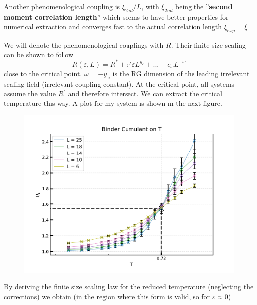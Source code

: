 	Another phenomenological coupling is $\xi_{2nd}/L$, with $\xi_{2nd}$ being the ''\textbf{second moment correlation length}'' which seems to have better properties for numerical extraction and converges fast to the actual correlation length $\xi_{exp} = \xi$
	
	We will denote the phenomenological couplings with $R$. Their finite size scaling can be shown \cite{hasenbusch2008critical} to follow
	\begin{equation}
		R(\varepsilon, L) =	R^* + r' \varepsilon L^{y_\varepsilon} + ... + c_\omega L^{-\omega}
	\end{equation}
	close to the critical point. $\omega =	- y_\omega$ is the RG dimension of the leading irrelevant scaling field (irrelevant coupling constant). At the critical point, all systems assume the value $R^*$ and therefore intersect. We can extract the critical temperature this way. A plot for my system is shown in the next figure.
	
	\begin{figure}
		\centering
		\includegraphics[width=13cm]{graphics/binder-cum.pdf}
	\end{figure}
	
	By deriving the finite size scaling law for the reduced temperature (neglecting the corrections) we obtain (in the region where this form is valid, so for $\varepsilon \approx 0 $)
	
